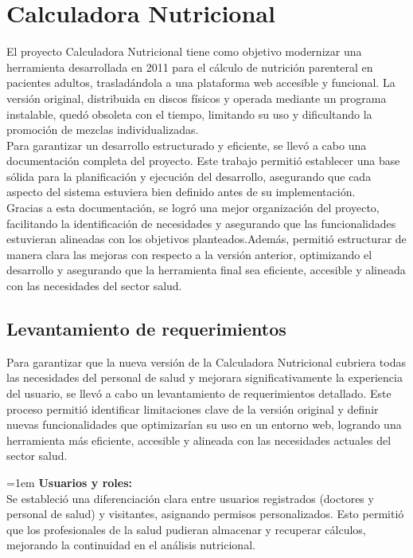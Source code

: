 \documentclass[12pt,letterpaper,spanish, xcolor=table]{report}
\numberwithin{figure}{subsection}
\begin{document}
	\newpage
	

\section{Calculadora Nutricional}

	El proyecto Calculadora Nutricional tiene como objetivo modernizar una herramienta desarrollada en 2011 para el cálculo de nutrición parenteral en pacientes adultos, trasladándola a una plataforma web accesible y funcional. La versión original, distribuida en discos físicos y operada mediante un programa instalable, quedó obsoleta con el tiempo, limitando su uso y dificultando la promoción de mezclas individualizadas.\\
	
	Para garantizar un desarrollo estructurado y eficiente, se llevó a cabo una documentación completa del proyecto. Este trabajo permitió establecer una base sólida para la planificación y ejecución del desarrollo, asegurando que cada aspecto del sistema estuviera bien definido antes de su implementación.\\
	
	Gracias a esta documentación, se logró una mejor organización del proyecto, facilitando la identificación de necesidades y asegurando que las funcionalidades estuvieran alineadas con los objetivos planteados.Además, permitió estructurar de manera clara las mejoras con respecto a la versión anterior, optimizando el desarrollo y asegurando que la herramienta final sea eficiente, accesible y alineada con las necesidades del sector salud.

\subsection{Levantamiento de requerimientos}

	Para garantizar que la nueva versión de la Calculadora Nutricional cubriera todas las necesidades del personal de salud y mejorara significativamente la experiencia del usuario, se llevó a cabo un levantamiento de requerimientos detallado. Este proceso permitió identificar limitaciones clave de la versión original y definir nuevas funcionalidades que optimizarían su uso en un entorno web, logrando una herramienta más eficiente, accesible y alineada con las necesidades actuales del sector salud.\\
	
	{\leftskip=1em 
	\noindent 
	\textbf{Usuarios y roles:}\\ 
	Se estableció una diferenciación clara entre usuarios registrados (doctores y personal de salud) y visitantes, asignando permisos personalizados. Esto permitió que los profesionales de la salud pudieran almacenar y recuperar cálculos, mejorando la continuidad en el análisis nutricional.\\
	\par}
\end{document}
